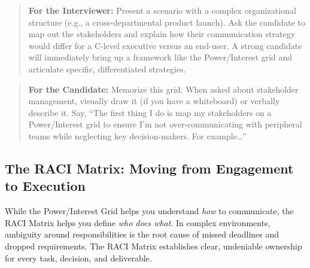 \begin{quote}
\textbf{For the Interviewer:} Present a scenario with a complex
organizational structure (e.g., a cross-departmental product launch).
Ask the candidate to map out the stakeholders and explain how their
communication strategy would differ for a C-level executive versus an
end-user. A strong candidate will immediately bring up a framework like
the Power/Interest grid and articulate specific, differentiated
strategies.
\end{quote}

\begin{quote}
\textbf{For the Candidate:} Memorize this grid. When asked about
stakeholder management, visually draw it (if you have a whiteboard) or
verbally describe it. Say, ``The first thing I do is map my stakeholders
on a Power/Interest grid to ensure I'm not over-communicating with
peripheral teams while neglecting key decision-makers. For
example\ldots{}''
\end{quote}

\subsection{The RACI Matrix: Moving from Engagement to
Execution}\label{the-raci-matrix-moving-from-engagement-to-execution}

While the Power/Interest Grid helps you understand \emph{how} to
communicate, the RACI Matrix helps you define \emph{who does what}. In
complex environments, ambiguity around responsibilities is the root
cause of missed deadlines and dropped requirements. The RACI Matrix
establishes clear, undeniable ownership for every task, decision, and
deliverable.

